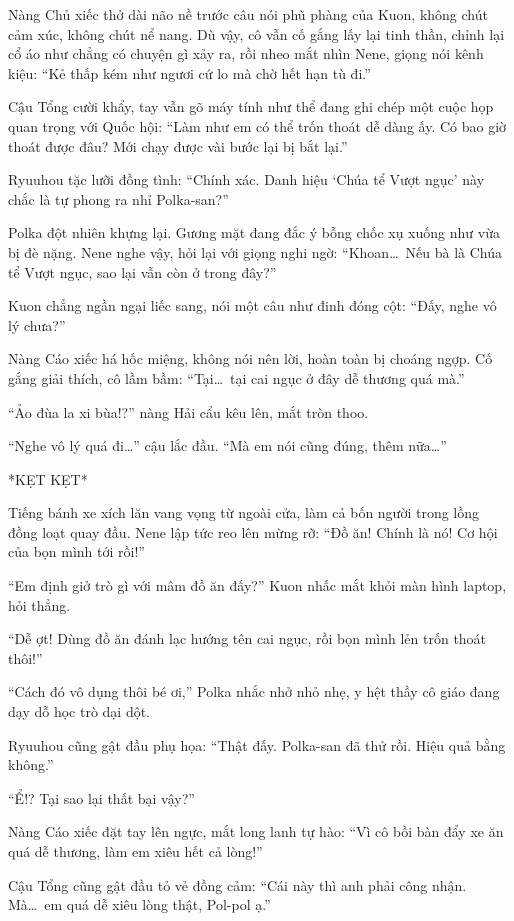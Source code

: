 \documentclass[../main.tex]{subfiles}
\begin{document}
Nàng Chủ xiếc thở dài não nề trước câu nói phũ phàng của Kuon, không chút cảm xúc, không chút nể nang. Dù vậy, cô vẫn cố gắng lấy lại tinh thần, chỉnh lại cổ áo như chẳng có chuyện gì xảy ra, rồi nheo mắt nhìn Nene, giọng nói kênh kiệu: ``Kẻ thấp kém như ngươi cứ lo mà chờ hết hạn tù đi.''

Cậu Tổng cười khẩy, tay vẫn gõ máy tính như thể đang ghi chép một cuộc họp quan trọng với Quốc hội: ``Làm như em có thể trốn thoát dễ dàng ấy. Có bao giờ thoát được đâu? Mới chạy được vài bước lại bị bắt lại.''

Ryuuhou tặc lưỡi đồng tình: ``Chính xác. Danh hiệu `Chúa tể Vượt ngục' này chắc là tự phong ra nhỉ Polka-san?''

Polka đột nhiên khựng lại. Gương mặt đang đắc ý bỗng chốc xụ xuống như vừa bị đè nặng. Nene nghe vậy, hỏi lại với giọng nghi ngờ: ``Khoan\dots\ Nếu bà là Chúa tể Vượt ngục, sao lại vẫn còn ở trong đây?''

Kuon chẳng ngần ngại liếc sang, nói một câu như đinh đóng cột: ``Đấy, nghe vô lý chưa?''

Nàng Cáo xiếc há hốc miệng, không nói nên lời, hoàn toàn bị choáng ngợp. Cố gắng giải thích, cô lầm bầm: ``Tại\dots\ tại cai ngục ở đây dễ thương quá mà.''

``Ảo đùa la xi bùa!?'' nàng Hải cẩu kêu lên, mắt tròn thoo.

``Nghe vô lý quá đi\dots'' cậu lắc đầu. ``Mà em nói cũng đúng, thêm nữa\dots''

*KẸT KẸT*

Tiếng bánh xe xích lăn vang vọng từ ngoài cửa, làm cả bốn người trong lồng đồng loạt quay đầu. Nene lập tức reo lên mừng rỡ: ``Đồ ăn! Chính là nó! Cơ hội của bọn mình tới rồi!''

``Em định giở trò gì với mâm đồ ăn đấy?'' Kuon nhấc mắt khỏi màn hình laptop, hỏi thẳng.

``Dễ ợt! Dùng đồ ăn đánh lạc hướng tên cai ngục, rồi bọn mình lẻn trốn thoát thôi!''

``Cách đó vô dụng thôi bé ơi,'' Polka nhắc nhở nhỏ nhẹ, y hệt thầy cô giáo đang dạy dỗ học trò dại dột.

Ryuuhou cũng gật đầu phụ họa: ``Thật đấy. Polka-san đã thử rồi. Hiệu quả bằng không.''

``Ể!? Tại sao lại thất bại vậy?''

Nàng Cáo xiếc đặt tay lên ngực, mắt long lanh tự hào: ``Vì cô bồi bàn đẩy xe ăn quá dễ thương, làm em xiêu hết cả lòng!''

Cậu Tổng cũng gật đầu tỏ vẻ đồng cảm: ``Cái này thì anh phải công nhận. Mà\dots\ em quá dễ xiêu lòng thật, Pol-pol ạ.''
\end{document}
